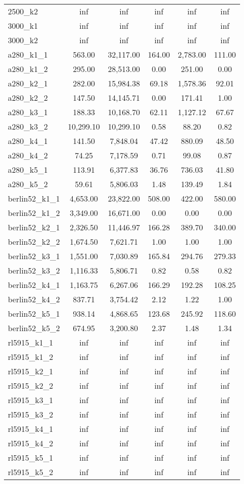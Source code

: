 \documentclass{article}
\begin{document}
\begin{center}
\begin{tabular}{|l|c|c|c|c|c|}
2500\_k2 & inf & inf & inf & inf & inf \\
3000\_k1 & inf & inf & inf & inf & inf \\
3000\_k2 & inf & inf & inf & inf & inf \\
a280\_k1\_1 & 563.00 & 32,117.00 & 164.00 & 2,783.00 & 111.00 \\
a280\_k1\_2 & 295.00 & 28,513.00 & 0.00 & 251.00 & 0.00 \\
a280\_k2\_1 & 282.00 & 15,984.38 & 69.18 & 1,578.36 & 92.01 \\
a280\_k2\_2 & 147.50 & 14,145.71 & 0.00 & 171.41 & 1.00 \\
a280\_k3\_1 & 188.33 & 10,168.70 & 62.11 & 1,127.12 & 67.67 \\
a280\_k3\_2 & 10,299.10 & 10,299.10 & 0.58 & 88.20 & 0.82 \\
a280\_k4\_1 & 141.50 & 7,848.04 & 47.42 & 880.09 & 48.50 \\
a280\_k4\_2 & 74.25 & 7,178.59 & 0.71 & 99.08 & 0.87 \\
a280\_k5\_1 & 113.91 & 6,377.83 & 36.76 & 736.03 & 41.80 \\
a280\_k5\_2 & 59.61 & 5,806.03 & 1.48 & 139.49 & 1.84 \\
berlin52\_k1\_1 & 4,653.00 & 23,822.00 & 508.00 & 422.00 & 580.00 \\
berlin52\_k1\_2 & 3,349.00 & 16,671.00 & 0.00 & 0.00 & 0.00 \\
berlin52\_k2\_1 & 2,326.50 & 11,446.97 & 166.28 & 389.70 & 340.00 \\
berlin52\_k2\_2 & 1,674.50 & 7,621.71 & 1.00 & 1.00 & 1.00 \\
berlin52\_k3\_1 & 1,551.00 & 7,030.89 & 165.84 & 294.76 & 279.33 \\
berlin52\_k3\_2 & 1,116.33 & 5,806.71 & 0.82 & 0.58 & 0.82 \\
berlin52\_k4\_1 & 1,163.75 & 6,267.06 & 166.29 & 192.28 & 108.25 \\
berlin52\_k4\_2 & 837.71 & 3,754.42 & 2.12 & 1.22 & 1.00 \\
berlin52\_k5\_1 & 938.14 & 4,868.65 & 123.68 & 245.92 & 118.60 \\
berlin52\_k5\_2 & 674.95 & 3,200.80 & 2.37 & 1.48 & 1.34 \\
rl5915\_k1\_1 & inf & inf & inf & inf & inf \\
rl5915\_k1\_2 & inf & inf & inf & inf & inf \\
rl5915\_k2\_1 & inf & inf & inf & inf & inf \\
rl5915\_k2\_2 & inf & inf & inf & inf & inf \\
rl5915\_k3\_1 & inf & inf & inf & inf & inf \\
rl5915\_k3\_2 & inf & inf & inf & inf & inf \\
rl5915\_k4\_1 & inf & inf & inf & inf & inf \\
rl5915\_k4\_2 & inf & inf & inf & inf & inf \\
rl5915\_k5\_1 & inf & inf & inf & inf & inf \\
rl5915\_k5\_2 & inf & inf & inf & inf & inf \\
\hline
\end{tabular}
\end{center}
\end{document}
